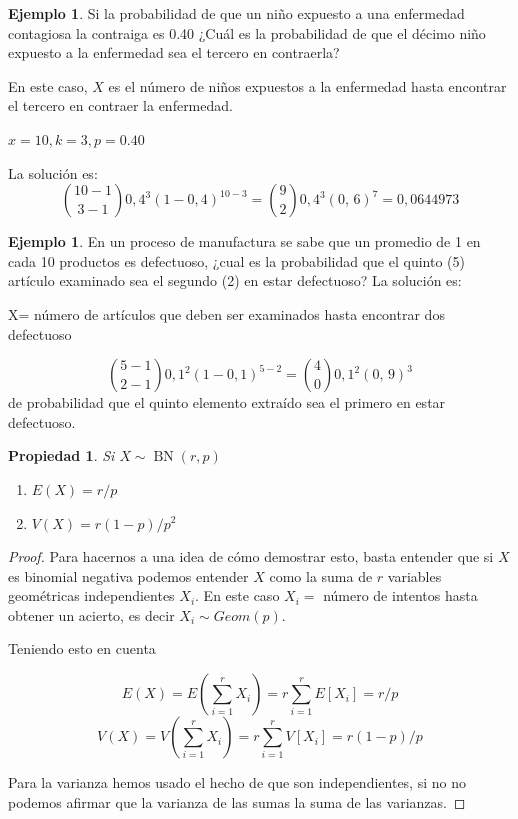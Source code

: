 \documentclass[]{book}
\theoremstyle{plain}
\newtheorem{property}[theorem]{Propiedad}
\theoremstyle{definition}
\newtheorem{example}[theorem]{Ejemplo}
\theoremstyle{definition} %
\begin{document}
\begin{example}

Si la probabilidad de que un niño expuesto a una enfermedad contagiosa
la contraiga es 0.40 ¿Cuál es la probabilidad de que el décimo niño
expuesto a la enfermedad sea el tercero en contraerla?

En este caso, \(X\) es el número de niños expuestos a la enfermedad
hasta encontrar el tercero en contraer la enfermedad.

\(\displaystyle \!x=10,k=3,p=0.40\)

La solución es:
\[\displaystyle {10-1 \choose 3-1}0,\!4^{3}(1-0,4)^{10-3}={9 \choose 2}0,\!4^{3}(0,\,6)^{7}=0,\!0644973\]
\end{example}

\begin{example}

En un proceso de manufactura se sabe que un promedio de 1 en cada 10
productos es defectuoso, ¿cual es la probabilidad que el quinto (5)
artículo examinado sea el segundo (2) en estar defectuoso? La solución
es:

X= número de artículos que deben ser examinados hasta encontrar dos
defectuoso

\[\displaystyle {5-1 \choose 2-1}0,\!1^{2}(1-0,\!1)^{5-2}={4 \choose 0}0,\!1^{2}(0,\,9)^{3}\]
de probabilidad que el quinto elemento extraído sea el primero en estar
defectuoso.
\end{example}

\begin{property}
  Si \(\displaystyle X\sim \operatorname {BN} (r,p)\)
  \begin{enumerate}[(1)]
    \item $E(X) = r/p$
    \item $V(X) = r(1-p)/p^2$
  \end{enumerate}
\end{property}

\begin{proof}
  Para hacernos a una idea de cómo demostrar esto, basta entender que si $X$ es binomial negativa podemos entender $X$ como la suma
  de $r$ variables geométricas independientes $X_i$. 
  En este caso $X_i = $ número de intentos hasta obtener un acierto, es decir $X_i \sim Geom (p)$.


  Teniendo esto en cuenta 

  \[E(X)= E(\sum^r_{i=1} X_i) = r \sum^r_{i=1} E[X_i] = r/p \]
  \[V(X)= V(\sum^r_{i=1} X_i) = r \sum^r_{i=1} V[X_i] = r(1-p)/p \] 

  Para la varianza hemos usado el hecho de que son independientes, si no no podemos afirmar que la varianza de las sumas 
  la suma de las varianzas.
\end{proof}
\end{document}
